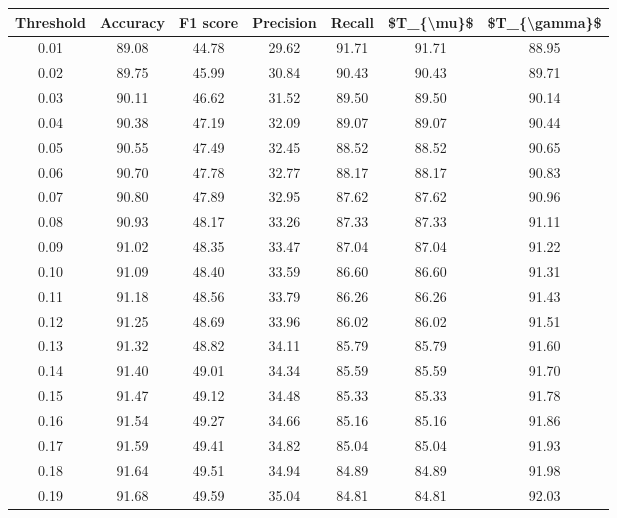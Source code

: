 \begin{tabular}{|c|c|c|c|c|c|c|}
\hline
 Threshold &  Accuracy &  F1 score &  Precision &  Recall &  \$T\_\{\textbackslash mu\}\$ &  \$T\_\{\textbackslash gamma\}\$ \\
\hline
      0.01 &     89.08 &     44.78 &      29.62 &   91.71 &      91.71 &         88.95 \\
      0.02 &     89.75 &     45.99 &      30.84 &   90.43 &      90.43 &         89.71 \\
      0.03 &     90.11 &     46.62 &      31.52 &   89.50 &      89.50 &         90.14 \\
      0.04 &     90.38 &     47.19 &      32.09 &   89.07 &      89.07 &         90.44 \\
      0.05 &     90.55 &     47.49 &      32.45 &   88.52 &      88.52 &         90.65 \\
      0.06 &     90.70 &     47.78 &      32.77 &   88.17 &      88.17 &         90.83 \\
      0.07 &     90.80 &     47.89 &      32.95 &   87.62 &      87.62 &         90.96 \\
      0.08 &     90.93 &     48.17 &      33.26 &   87.33 &      87.33 &         91.11 \\
      0.09 &     91.02 &     48.35 &      33.47 &   87.04 &      87.04 &         91.22 \\
      0.10 &     91.09 &     48.40 &      33.59 &   86.60 &      86.60 &         91.31 \\
      0.11 &     91.18 &     48.56 &      33.79 &   86.26 &      86.26 &         91.43 \\
      0.12 &     91.25 &     48.69 &      33.96 &   86.02 &      86.02 &         91.51 \\
      0.13 &     91.32 &     48.82 &      34.11 &   85.79 &      85.79 &         91.60 \\
      0.14 &     91.40 &     49.01 &      34.34 &   85.59 &      85.59 &         91.70 \\
      0.15 &     91.47 &     49.12 &      34.48 &   85.33 &      85.33 &         91.78 \\
      0.16 &     91.54 &     49.27 &      34.66 &   85.16 &      85.16 &         91.86 \\
      0.17 &     91.59 &     49.41 &      34.82 &   85.04 &      85.04 &         91.93 \\
      0.18 &     91.64 &     49.51 &      34.94 &   84.89 &      84.89 &         91.98 \\
      0.19 &     91.68 &     49.59 &      35.04 &   84.81 &      84.81 &         92.03 \\

\end{tabular}
